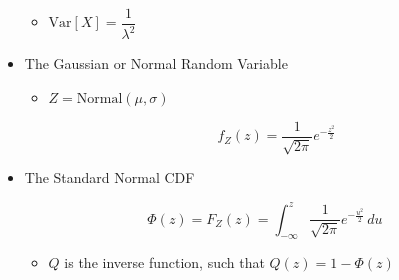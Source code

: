 \begin{itemize}
\begin{itemize}
      \item $\text{Var}[X]=\dfrac{1}{\lambda^2}$

    \end{itemize}

  \item The Gaussian or Normal Random Variable

    \begin{itemize}

      \item $Z=\text{Normal}(\mu,\sigma)$

        $$f_Z(z)=\frac{1}{\sqrt{2\pi}}e^{-\frac{z^2}{2}}$$

    \end{itemize}

  \item The Standard Normal CDF

    $$\Phi(z)=F_Z(z)=\int_{-\infty}^z \frac{1}{\sqrt{2\pi}}e^{-\frac{u^2}{2}}\,du$$

    \begin{itemize}

      \item $Q$ is the inverse function, such that $Q(z)=1-\Phi(z)$

    \end{itemize}

\end{itemize}



